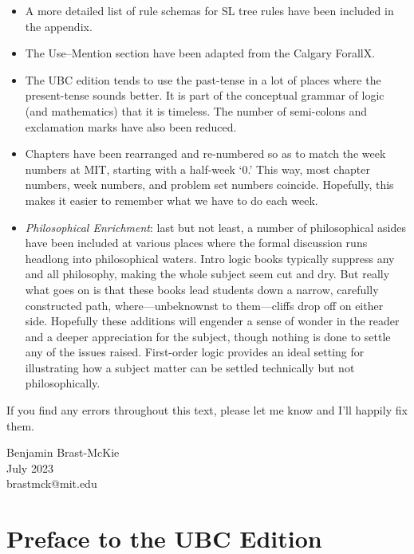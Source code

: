 \begin{itemize}
\item A more detailed list of rule schemas for SL tree rules have been included in the appendix. 

\item The Use--Mention section have been adapted from the Calgary ForallX.

\item The UBC edition tends to use the past-tense in a lot of places where the present-tense sounds better.
  It is part of the conceptual grammar of logic (and mathematics) that it is timeless. 
  The number of semi-colons and exclamation marks have also been reduced.

\item Chapters have been rearranged and re-numbered so as to match the week numbers at MIT, starting with a half-week `0.'
  This way, most chapter numbers, week numbers, and problem set numbers coincide.
  Hopefully, this makes it easier to remember what we have to do each week.

\item \textit{Philosophical Enrichment}: last but not least, a number of philosophical asides have been included at various places where the formal discussion runs headlong into philosophical waters.
  Intro logic books typically suppress any and all philosophy, making the whole subject seem cut and dry.
  But really what goes on is that these books lead students down a narrow, carefully constructed path, where---unbeknownst to them---cliffs drop off on either side.
  Hopefully these additions will engender a sense of wonder in the reader and a deeper appreciation for the subject, though nothing is done to settle any of the issues raised.
  First-order logic provides an ideal setting for illustrating how a subject matter can be settled technically but not philosophically.

\end{itemize}

If you find any errors throughout this text, please let me know and I'll happily fix them.

\begin{flushright}
Benjamin Brast-McKie \\
July 2023 \\
brastmck@mit.edu
\end{flushright}


\chapter*{Preface to the UBC Edition}
\label{ch.preface}

